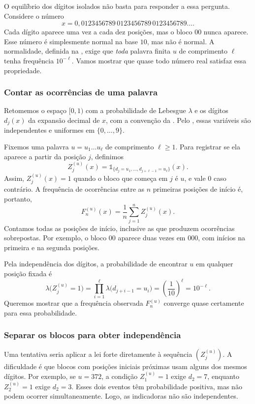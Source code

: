 \documentclass[12pt,portuguese]{article}
\theoremstyle{definition}
\theoremstyle{plainexercise}
\theoremstyle{starredexercise}
\theoremstyle{definition}
\begin{document}
O equilíbrio dos dígitos isolados não basta para responder a essa pergunta.
Considere o número
\[
x=0{,}0123456789\,0123456789\,0123456789\ldots.
\]
Cada dígito aparece uma vez a cada dez posições, mas o bloco $00$ nunca
aparece. Esse número é simplesmente normal na base $10$, mas não é normal.
A normalidade, definida na , exige que \emph{toda} palavra
finita $u$ de comprimento $\ell$ tenha frequência $10^{-\ell}$. Vamos mostrar
que quase todo número real satisfaz essa propriedade.

\subsubsection{Contar as ocorrências de uma palavra}

Retomemos o espaço $[0,1)$ com a probabilidade de Lebesgue $\lambda$ e os
dígitos $d_j(x)$ da expansão decimal de $x$, com a convenção da
. Pelo , essas
variáveis são independentes e uniformes em $\{0,\ldots,9\}$.

Fixemos uma palavra $u=u_1\ldots u_\ell$ de comprimento $\ell\geqslant1$.
Para registrar se ela aparece a partir da posição $j$, definimos
\[
Z_j^{(u)}(x)
=\mathds{1}_{\{d_j=u_1,\ldots,d_{j+\ell-1}=u_\ell\}}(x).
\]
Assim, $Z_j^{(u)}(x)=1$ quando o bloco que começa em $j$ é $u$, e vale $0$
caso contrário. A frequência de ocorrências entre as $n$ primeiras
posições de início é, portanto,
\[
F_n^{(u)}(x)=\frac{1}{n}\sum_{j=1}^{n}Z_j^{(u)}(x).
\]
Contamos todas as posições de início, inclusive as que produzem ocorrências
sobrepostas. Por exemplo, o bloco $00$ aparece duas vezes em $000$, com
inícios na primeira e na segunda posições.

Pela independência dos dígitos, a probabilidade de encontrar $u$ em qualquer
posição fixada é
\[
\lambda\bigl(Z_j^{(u)}=1\bigr)
=\prod_{i=1}^{\ell}\lambda\bigl(d_{j+i-1}=u_i\bigr)
=\left(\frac{1}{10}\right)^\ell
=10^{-\ell}.
\]
Queremos mostrar que a frequência observada $F_n^{(u)}$ converge quase
certamente para essa probabilidade.

\subsubsection{Separar os blocos para obter independência}

Uma tentativa seria aplicar a lei forte diretamente à sequência
$(Z_j^{(u)})$. A dificuldade é que blocos com posições iniciais próximas
usam alguns dos mesmos dígitos. Por exemplo, se $u=372$, a condição
$Z_1^{(u)}=1$ exige $d_2=7$, enquanto $Z_2^{(u)}=1$ exige $d_2=3$.
Esses dois eventos têm probabilidade positiva, mas não podem ocorrer
simultaneamente. Logo, as indicadoras não são independentes.
\end{document}
